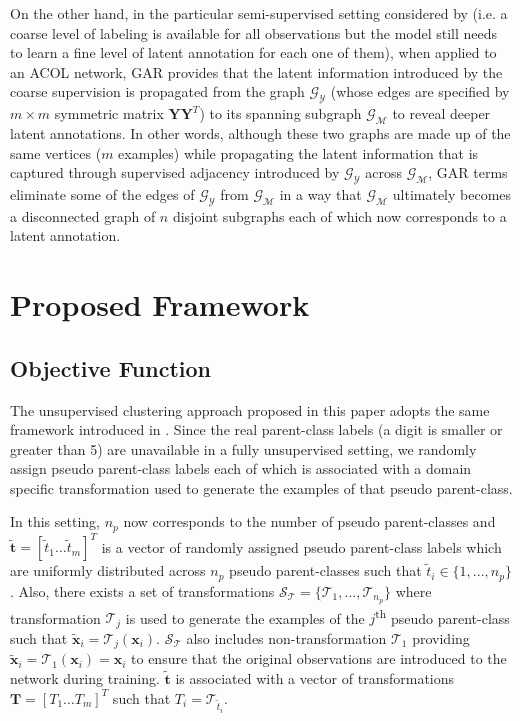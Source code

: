 \documentclass{article} \usepackage{iclr2018_conference,times}
\begin{document}
On the other hand, in the particular semi-supervised setting considered by \citet{KilincU17ACOL} (i.e. a coarse level of labeling is available for all observations but the model still needs to learn a fine level of latent annotation for each one of them), when applied to an ACOL network, GAR provides that the latent information introduced by the coarse supervision is propagated from the graph $\mathcal{G}_\mathcal{Y}$ (whose edges are specified by $m \times m$ symmetric matrix $\boldsymbol{Y}\boldsymbol{Y}^T$) to its spanning subgraph $\mathcal{G}_\mathcal{M}$ to reveal deeper latent annotations. In other words, although these two graphs are made up of the same vertices ($m$ examples) while propagating the latent information that is captured through supervised adjacency introduced by $\mathcal{G}_\mathcal{Y}$
across $\mathcal{G}_\mathcal{M}$, GAR terms eliminate some of the edges of $\mathcal{G}_\mathcal{Y}$ from $\mathcal{G}_\mathcal{M}$ in a way that $\mathcal{G}_\mathcal{M}$ ultimately becomes a disconnected graph of $n$ disjoint subgraphs each of which now corresponds to a latent annotation.

\section{Proposed Framework}
\subsection{Objective Function}

The unsupervised clustering approach proposed in this paper adopts the same framework introduced in \citet{KilincU17ACOL}. Since the real parent-class labels (a digit is smaller or greater than 5) are unavailable in a fully unsupervised setting, we randomly assign pseudo parent-class labels each of which is associated with a domain specific transformation used to generate the examples of that pseudo parent-class.

In this setting, $n_p$ now corresponds to the number of pseudo parent-classes and $\boldsymbol{\tilde{t}}=[\tilde{t}_1\dots\tilde{t}_m]^T$ is a vector of randomly assigned pseudo parent-class labels which are uniformly distributed across $n_p$ pseudo parent-classes such that $\tilde{t}_i \in \{1,...,n_p\}$. Also, there exists a set of transformations $\mathcal{S}_\mathcal{T}=\{\mathcal{T}_1,...,\mathcal{T}_{n_p}\}$ where transformation $\mathcal{T}_j$ is used to generate the examples of the $j$\textsuperscript{th} pseudo parent-class such that $\boldsymbol{\tilde{x}}_i=\mathcal{T}_j(\boldsymbol{x}_i)$. $\mathcal{S}_\mathcal{T}$ also includes non-transformation $\mathcal{T}_1$ providing $\boldsymbol{\tilde{x}}_i=\mathcal{T}_1(\boldsymbol{x}_i)=\boldsymbol{x}_i$ to ensure that the original observations are introduced to the network during training. $\boldsymbol{\tilde{t}}$ is associated with a vector of transformations $\boldsymbol{T}=[T_1 \dots T_m]^T$ such that $T_i=\mathcal{T}_{\tilde{t}_i}$. 
\end{document}
